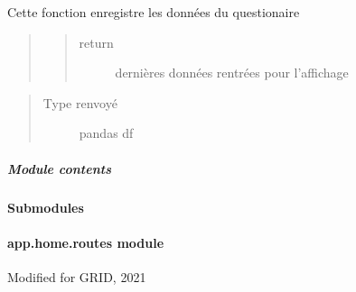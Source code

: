 \documentclass[letterpaper,10pt,french]{sphinxmanual}
\begin{document}

\begin{fulllineitems}
\label{\detokenize{app.home.content_gen:app.home.content_gen.questionaire.save_data}}
\sphinxAtStartPar
Cette fonction enregistre les données du questionaire
\begin{quote}
\begin{quote}\begin{description}
\item[{return}] \leavevmode
\sphinxAtStartPar
dernières données rentrées pour l’affichage

\end{description}\end{quote}
\end{quote}
\begin{quote}\begin{description}
\item[{Type renvoyé}] \leavevmode
\sphinxAtStartPar
pandas df

\end{description}\end{quote}

\end{fulllineitems}



\subparagraph{Module contents}
\label{\detokenize{app.home.content_gen:module-app.home.content_gen}}\label{\detokenize{app.home.content_gen:module-contents}}

\paragraph{Submodules}
\label{\detokenize{app.home:submodules}}

\paragraph{app.home.routes module}
\label{\detokenize{app.home:module-app.home.routes}}\label{\detokenize{app.home:app-home-routes-module}}
\sphinxAtStartPar
Modified for GRID, 2021
\end{document}
